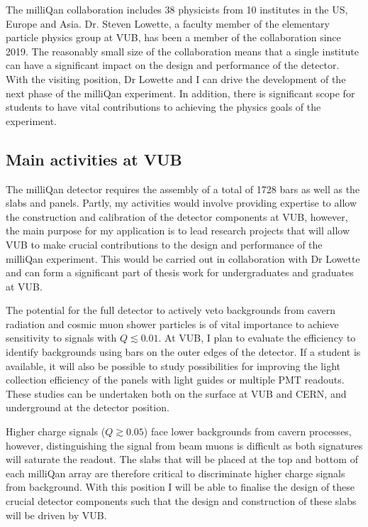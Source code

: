 \documentclass[11pt]{article}
\theoremstyle{plain} \numberwithin{equation}{section}
\theoremstyle{definition}
\begin{document}
The milliQan collaboration includes 38 physicists from 10 institutes in the US, 
Europe and Asia. Dr. Steven Lowette, a faculty member of the elementary particle 
physics group at VUB, has been a member of the collaboration since
2019. The reasonably small size of the collaboration means that a single institute
can have a significant impact on the design and performance of the detector. 
With the visiting position, Dr Lowette and I can drive the development
of the next phase of the milliQan experiment. In addition,
there is significant scope for students to have vital contributions to 
achieving the physics goals of the experiment.  

\subsection*{Main activities at VUB}

The milliQan detector requires the assembly of a total of 1728 bars as well
as the slabs and panels. Partly, my activities would involve 
providing expertise to allow the construction and calibration of the detector components at VUB, 
however, the main purpose for my application is
to lead research projects that will allow VUB to make crucial contributions to
the design and performance of the milliQan experiment. 
This would be carried out in collaboration with Dr Lowette and
can form a significant part of thesis work for undergraduates and graduates at VUB.

The potential for the full detector to actively veto backgrounds from cavern radiation
and cosmic muon shower particles is of vital importance to 
achieve sensitivity to signals with $Q \lesssim 0.01$. At VUB, I plan to 
evaluate the efficiency to identify backgrounds using 
bars on the outer edges of the detector. If a student is available, it will also
be possible to study possibilities for improving the light collection efficiency of the panels 
with light guides or multiple PMT readouts. These studies can be undertaken 
both on the surface at VUB and CERN, and underground at the detector position.

Higher charge signals ($Q \gtrsim 0.05$) face lower backgrounds from cavern processes,
however, distinguishing the signal from beam muons is difficult as both 
signatures will saturate the readout. The slabs that will be placed at the top and bottom 
of each milliQan array are therefore critical to discriminate higher charge signals from background.
With this position I will be able to finalise the design of these crucial detector components such that the 
design and construction of these slabs will be driven by VUB.
\end{document}
